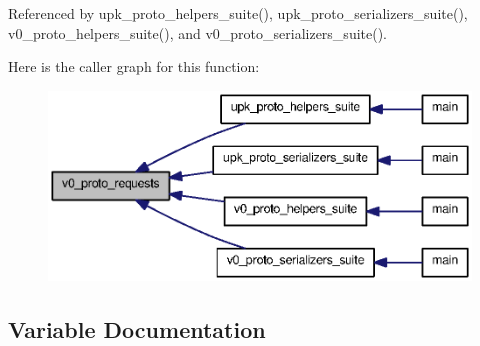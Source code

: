 Referenced by upk\_\-proto\_\-helpers\_\-suite(), upk\_\-proto\_\-serializers\_\-suite(), v0\_\-proto\_\-helpers\_\-suite(), and v0\_\-proto\_\-serializers\_\-suite().



Here is the caller graph for this function:\nopagebreak
\begin{figure}[H]
\begin{center}
\leavevmode
\includegraphics[width=386pt]{v0__protocol__generic__value__checks_8inc_8c_a085188d170c07b95395023cb9434bdd0_icgraph}
\end{center}
\end{figure}




\subsection{Variable Documentation}
\subsubsection[{END\_\-TEST}]{}\label{v0__protocol__generic__value__checks_8inc_8c_a458b78ce9e48beb128edb722b07e4716}
